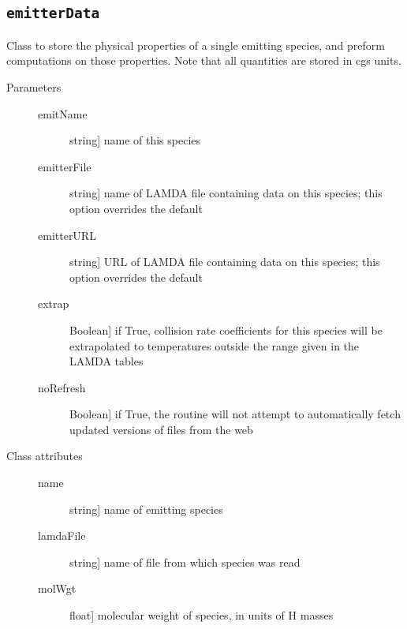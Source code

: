 \documentclass[letterpaper,10pt,english]{sphinxmanual}
\begin{document}
\subsection{\texttt{emitterData}}
\label{fulldoc:emitterdata}\label{fulldoc:sssec-full-emitterdata}

\begin{fulllineitems}
\label{fulldoc:despotic.emitterData}
Class to store the physical properties of a single emitting
species, and preform computations on those properties. Note that
all quantities are stored in cgs units.
\begin{description}
\item[{Parameters}] \leavevmode\begin{description}
\item[{emitName}] \leavevmode{[}string{]}
name of this species

\item[{emitterFile}] \leavevmode{[}string{]}
name of LAMDA file containing data on this species; this
option overrides the default

\item[{emitterURL}] \leavevmode{[}string{]}
URL of LAMDA file containing data on this species; this
option overrides the default

\item[{extrap}] \leavevmode{[}Boolean{]}
if True, collision rate coefficients for this species will
be extrapolated to temperatures outside the range given in
the LAMDA tables

\item[{noRefresh}] \leavevmode{[}Boolean{]}
if True, the routine will not attempt to automatically
fetch updated versions of files from the web

\end{description}

\item[{Class attributes}] \leavevmode\begin{description}
\item[{name}] \leavevmode{[}string{]}
name of emitting species

\item[{lamdaFile}] \leavevmode{[}string{]}
name of file from which species was read

\item[{molWgt}] \leavevmode{[}float{]}
molecular weight of species, in units of H masses


\end{description}
\end{description}
\end{fulllineitems}
\end{document}
